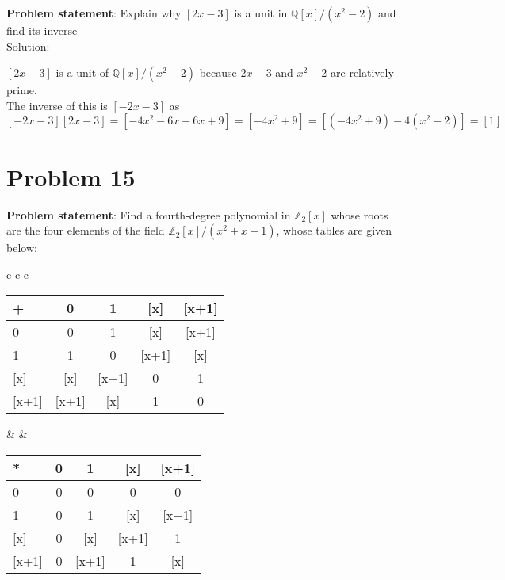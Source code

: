 \documentclass{article} %
\begin{document}
\textbf{Problem statement}: Explain why $[2x-3]$ is a unit in $\mathbb{Q}[x]/(x^2-2)$ and find its inverse
\\

Solution: 
\begin{addmargin}[1em]{0em}
$[2x-3]$ is a unit of $\mathbb{Q}[x]/(x^2 - 2)$ because $2x - 3$ and $x^2 - 2$ are relatively prime.
\\The inverse of this is $[-2x - 3]$ as $[-2x - 3][2x-3] = [-4x^2 -6x + 6x + 9] = [-4x^2 + 9] = [(-4x^2 + 9) - 4(x^2 - 2)] = [1]$
\end{addmargin}

\newpage

\section*{Problem 15}


\textbf{Problem statement}: Find a fourth-degree polynomial in $\mathbb{Z}_2[x]$ whose roots are the four elements of the field $\mathbb{Z}_2[x]/(x^2 + x + 1)$, whose tables are given below: \\
\begin{tabular}{c c c}
\begin{tabular}{l | c c c c }
+       & 0        & 1         & [x]      & [x+1] \\ \hline
0        & 0        & 1         & [x]      & [x+1] \\
1        & 1        & 0         & [x+1] & [x]      \\
{[}x]     & [x]      & [x+1] & 0         & 1         \\
{[}x+1] & [x+1] & [x]     & 1         & 0         \\
\end{tabular}
& \quad &
\begin{tabular}{l | c c c c }
*       & 0        & 1         & [x]      & [x+1] \\ \hline
0        & 0        &0        & 0      & 0 \\
1        & 0        & 1         & [x] & [x+1]      \\
{[}x]     & 0     & [x] & [x+1]         & 1         \\
{[}x+1] & 0& [x+1]     & 1         & [x]         \\
\end{tabular}
\end{tabular}
\\
\end{document}
